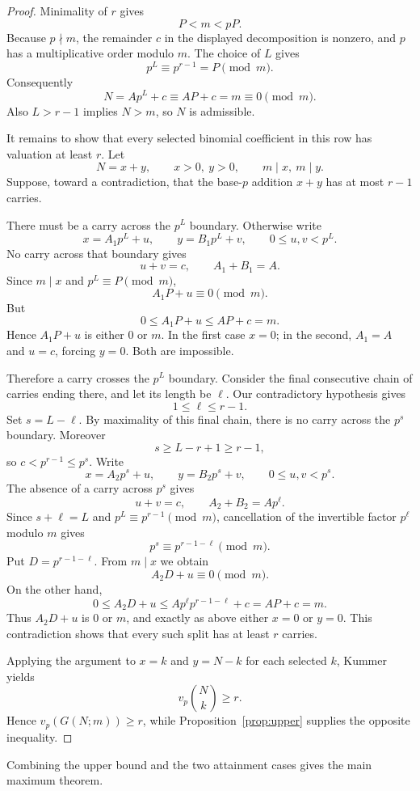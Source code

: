 \documentclass[11pt]{article}
\theoremstyle{definition}
\theoremstyle{remark}
\begin{document}
\begin{proof}
Minimality of $r$ gives
\[
  P<m<pP.
\]
Because $p\nmid m$, the remainder $c$ in the displayed decomposition is nonzero, and $p$ has a multiplicative order modulo $m$. The choice of $L$ gives
\[
  p^L\equiv p^{r-1}=P\pmod m.
\]
Consequently
\[
  N=A p^L+c\equiv AP+c=m\equiv0\pmod m.
\]
Also $L>r-1$ implies $N>m$, so $N$ is admissible.

It remains to show that every selected binomial coefficient in this row has valuation at least $r$. Let
\[
  N=x+y,
  \qquad x>0,\ y>0,
  \qquad m\mid x,\ m\mid y.
\]
Suppose, toward a contradiction, that the base-$p$ addition $x+y$ has at most $r-1$ carries.

There must be a carry across the $p^L$ boundary. Otherwise write
\[
  x=A_1p^L+u,
  \qquad y=B_1p^L+v,
  \qquad 0\le u,v<p^L.
\]
No carry across that boundary gives
\[
  u+v=c,\qquad A_1+B_1=A.
\]
Since $m\mid x$ and $p^L\equiv P\pmod m$,
\[
  A_1P+u\equiv0\pmod m.
\]
But
\[
  0\le A_1P+u\le AP+c=m.
\]
Hence $A_1P+u$ is either $0$ or $m$. In the first case $x=0$; in the second, $A_1=A$ and $u=c$, forcing $y=0$. Both are impossible.

Therefore a carry crosses the $p^L$ boundary. Consider the final consecutive chain of carries ending there, and let its length be $\ell$. Our contradictory hypothesis gives
\[
  1\le\ell\le r-1.
\]
Set $s=L-\ell$. By maximality of this final chain, there is no carry across the $p^s$ boundary. Moreover
\[
  s\ge L-r+1\ge r-1,
\]
so $c<p^{r-1}\le p^s$. Write
\[
  x=A_2p^s+u,
  \qquad y=B_2p^s+v,
  \qquad 0\le u,v<p^s.
\]
The absence of a carry across $p^s$ gives
\[
  u+v=c,
  \qquad A_2+B_2=A p^\ell.
\]
Since $s+\ell=L$ and $p^L\equiv p^{r-1}\pmod m$, cancellation of the invertible factor $p^\ell$ modulo $m$ gives
\[
  p^s\equiv p^{r-1-\ell}\pmod m.
\]
Put $D=p^{r-1-\ell}$. From $m\mid x$ we obtain
\[
  A_2D+u\equiv0\pmod m.
\]
On the other hand,
\[
  0\le A_2D+u
  \le A p^\ell p^{r-1-\ell}+c
  =AP+c=m.
\]
Thus $A_2D+u$ is $0$ or $m$, and exactly as above either $x=0$ or $y=0$. This contradiction shows that every such split has at least $r$ carries.

Applying the argument to $x=k$ and $y=N-k$ for each selected $k$, Kummer yields
\[
  v_p\binom Nk\ge r.
\]
Hence $v_p(G(N;m))\ge r$, while Proposition~\ref{prop:upper} supplies the opposite inequality.
\end{proof}

Combining the upper bound and the two attainment cases gives the main maximum theorem.
\end{document}
